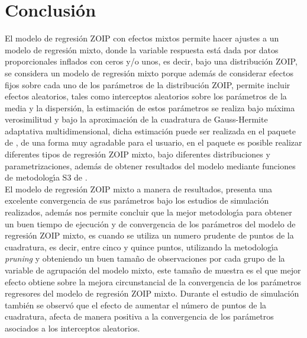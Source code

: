 
\section{Conclusi\'{o}n}

El modelo de regresi\'{o}n ZOIP con efectos mixtos permite hacer ajustes a un modelo de regresi\'{o}n mixto, donde la variable respuesta est\'{a} dada por datos proporcionales inflados con ceros y/o unos, es decir, bajo una distribuci\'{o}n ZOIP, se considera un modelo de regresi\'{o}n mixto porque adem\'{a}s de considerar efectos fijos sobre cada uno de los par\'{a}metros de la distribuci\'{o}n ZOIP, permite incluir efectos aleatorios, tales como interceptos aleatorios sobre los par\'{a}metros de la media y la dispersi\'{o}n, la estimaci\'{o}n de estos par\'{a}metros se realiza bajo m\'{a}xima verosimilitud y bajo la aproximaci\'{o}n de la cuadratura de Gauss-Hermite adaptativa multidimensional, dicha estimaci\'{o}n puede ser realizada en el paquete  de , de una forma muy agradable para el usuario, en el paquete es posible realizar diferentes tipos de regresi\'{o}n ZOIP mixto, bajo diferentes distribuciones y parametrizaciones, adem\'{a}s de obtener resultados del modelo mediante funciones de metodolog\'{\i}a S3 de .\\

El modelo de regresi\'{o}n ZOIP mixto a manera de resultados, presenta una excelente convergencia de sus par\'{a}metros bajo los estudios de simulaci\'{o}n realizados, adem\'{a}s nos permite concluir que la mejor metodolog\'{\i}a para obtener un buen tiempo de ejecuci\'{o}n y de convergencia de los par\'{a}metros del modelo de regresi\'{o}n ZOIP mixto, es cuando se utiliza un numero prudente de puntos de la cuadratura, es decir, entre cinco y quince puntos, utilizando la metodolog\'{\i}a \textit{pruning} y obteniendo un buen tama\~{n}o de observaciones por cada grupo de la variable de agrupaci\'{o}n del modelo mixto, este tama\~{n}o de muestra es el que mejor efecto obtiene sobre la mejora circunstancial de la convergencia de los par\'{a}metros regresores del modelo de regresi\'{o}n ZOIP mixto. Durante el estudio de simulaci\'{o}n tambi\'{e}n se observ\'{o} que el efecto de aumentar el n\'{u}mero de puntos de la cuadratura, afecta de manera positiva a la convergencia de los par\'{a}metros asociados a los interceptos aleatorios.
